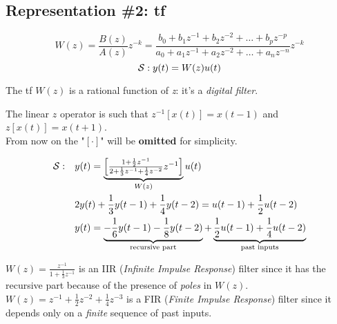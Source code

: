 
\subsection{Representation \#2: \acrfull{tf}}

\[
    W(z) = \frac{B(z)}{A(z)} z^{-k} = \frac{b_0 + b_1z^{-1} + b_2z^{-2} + \ldots + b_pz^{-p}}{a_0 + a_1z^{-1} + a_2z^{-2} + \ldots + a_nz^{-n}} z^{-k} 
\]
\vspace{1pt}
\[
     \mathcal{S}: y(t) = W(z)u(t)
\]     

The \gls{tf} $W(z)$ is a rational function of \emph{z}: it's a \emph{digital filter}.\\

\begin{recall}[$z$ operator]
    The linear $z$ operator is such that $z^{-1}[x(t)]=x(t-1)$ and $z[x(t)]=x(t+1)$.\\
    From now on the "$[\cdot]$" will be \textbf{omitted} for simplicity.
\end{recall}


\begin{example}
    \begin{align*}
    \mathcal{S}: \quad
        & y(t) = \underbrace{\begin{bmatrix}
            \frac{1+\frac{1}{2}z^{-1}}{2+\frac{1}{3}z^{-1}+\frac{1}{4}z^{-2}} z^{-1}
        \end{bmatrix}}_{W(z)} u(t) \\
        & 2y(t) + \frac{1}{3}y(t-1) + \frac{1}{4}y(t-2) = u(t-1) + \frac{1}{2}u(t-2) \\
        & y(t) = \underbrace{-\frac{1}{6}y(t-1) - \frac{1}{8}y(t-2)}_\text{recursive part} + \underbrace{\frac{1}{2}u(t-1) + \frac{1}{4}u(t-2)}_\text{past inputs}
    \end{align*}

\end{example}
\begin{remark}
\hfill \break 
    $\displaystyle W(z) = \frac{z^{-1}}{1 + \frac{1}{3}z^{-1}}$ is an IIR (\emph{Infinite Impulse Response}) filter since it has the recursive part because of the presence of \emph{poles} in $W(z)$.\\
    $\displaystyle W(z) = z^{-1} + \frac{1}{2}z^{-2} + \frac{1}{4}z^{-3}$ is a FIR (\emph{Finite Impulse Response}) filter since it depends only on a \emph{finite} sequence of past inputs.
\end{remark}


